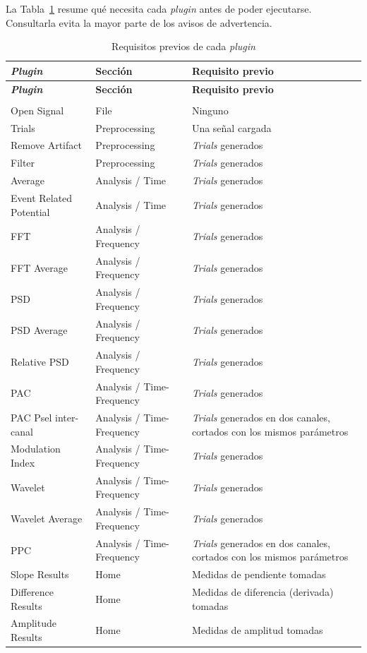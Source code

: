 \documentclass[11pt,a4paper]{article}
\begin{document}
La Tabla~\ref{tab:mu_requisitos_trials} resume qu\'e necesita cada \textit{plugin} antes de poder ejecutarse. Consultarla evita la mayor parte de los avisos de advertencia.

\begin{center}
\small
\begin{longtable}{|p{}|p{}|p{}|}
\hline
\textbf{\textit{Plugin}} & \textbf{Secci\'on} & \textbf{Requisito previo} \\
\hline
\endfirsthead
\hline
\textbf{\textit{Plugin}} & \textbf{Secci\'on} & \textbf{Requisito previo} \\
\hline
\endhead
\hline
\endfoot
\hline
\caption{Requisitos previos de cada \textit{plugin}} \label{tab:mu_requisitos_trials} \\
\endlastfoot
Open Signal & File & Ninguno \\
\hline
Trials & Preprocessing & Una se\~nal cargada \\
\hline
Remove Artifact & Preprocessing & \textit{Trials} generados \\
\hline
Filter & Preprocessing & \textit{Trials} generados \\
\hline
Average & Analysis / Time & \textit{Trials} generados \\
\hline
Event Related Potential & Analysis / Time & \textit{Trials} generados \\
\hline
FFT & Analysis / Frequency & \textit{Trials} generados \\
\hline
FFT Average & Analysis / Frequency & \textit{Trials} generados \\
\hline
PSD & Analysis / Frequency & \textit{Trials} generados \\
\hline
PSD Average & Analysis / Frequency & \textit{Trials} generados \\
\hline
Relative PSD & Analysis / Frequency & \textit{Trials} generados \\
\hline
PAC & Analysis / Time-Frequency & \textit{Trials} generados \\
\hline
PAC Psel inter-canal & Analysis / Time-Frequency & \textit{Trials} generados en dos canales, cortados con los mismos par\'ametros \\
\hline
Modulation Index & Analysis / Time-Frequency & \textit{Trials} generados \\
\hline
Wavelet & Analysis / Time-Frequency & \textit{Trials} generados \\
\hline
Wavelet Average & Analysis / Time-Frequency & \textit{Trials} generados \\
\hline
PPC & Analysis / Time-Frequency & \textit{Trials} generados en dos canales, cortados con los mismos par\'ametros \\
\hline
Slope Results & Home & Medidas de pendiente tomadas \\
\hline
Difference Results & Home & Medidas de diferencia (derivada) tomadas \\
\hline
Amplitude Results & Home & Medidas de amplitud tomadas \\
\hline
\end{longtable}
\end{center}
\end{document}
